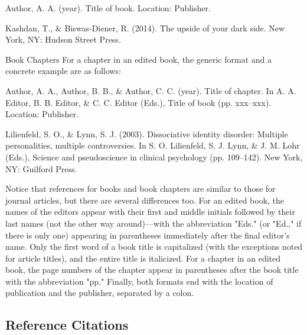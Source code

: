 \begin{kframe}
Author, A. A. (year). Title of book. Location: Publisher.
\end{kframe}

\begin{kframe}
Kashdan, T., \& Biswas-Diener, R. (2014). The upside of your dark side. New York, NY: Hudson Street Press.

\end{kframe}

Book Chapters
For a chapter in an edited book, the generic format and a concrete example are as follows:


\begin{kframe}
Author, A. A., Author, B. B., \& Author, C. C. (year). Title of chapter. In A. A. Editor, B. B. Editor, \& C. C. Editor (Eds.), Title of book (pp. xxx–xxx). Location: Publisher.

\end{kframe}

\begin{kframe}
Lilienfeld, S. O., \& Lynn, S. J. (2003). Dissociative identity disorder: Multiple personalities, multiple controversies. In S. O. Lilienfeld, S. J. Lynn, \& J. M. Lohr (Eds.), Science and pseudoscience in clinical psychology (pp. 109–142). New York, NY: Guilford Press.

\end{kframe}

Notice that references for books and book chapters are similar to those for journal articles, but there are several differences too. For an edited book, the names of the editors appear with their first and middle initials followed by their last names (not the other way around)---with the abbreviation "Eds." (or "Ed.," if there is only one) appearing in parentheses immediately after the final editor's name. Only the first word of a book title is capitalized (with the exceptions noted for article titles), and the entire title is italicized. For a chapter in an edited book, the page numbers of the chapter appear in parentheses after the book title with the abbreviation "pp." Finally, both formats end with the location of publication and the publisher, separated by a colon.


\subsection{Reference Citations}

